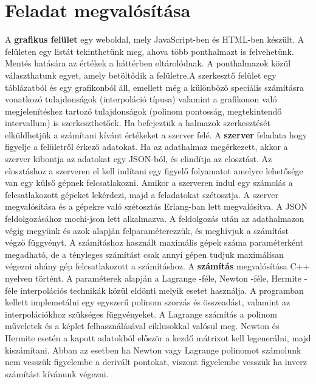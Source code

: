 \documentclass{elteikthesis}
\begin{document}
\section{Feladat megvalósítása}
A \textbf{grafikus felület}  egy weboldal, mely JavaScript-ben és HTML-ben készült.
 A felületen egy listát tekinthetünk meg, ahova több ponthalmazt is felvehetünk. \newline  Mentés hatására az értékek a háttérben eltárolódnak. A ponthalmazok közül választhatunk egyet, amely betöltődik a felületre.\newline A szerkesztő felület egy táblázatból és egy grafikonból áll, emellett még a különböző speciális számításra vonatkozó tulajdonságok (interpoláció típusa) valamint a grafikonon való megjelenítéshez tartozó tulajdonságok (polinom pontosság, megtekintendő intervallum) is szerkeszthetőek. \newline Ha befejeztük a halmazok szerkesztését elküldhetjük a számítani kívánt értékeket a szerver felé.
 \newline\newline
A \textbf{szerver} feladata hogy figyelje a felületről érkező adatokat. Ha az adathalmaz megérkezett, akkor a szerver kibontja az adatokat egy JSON-ból, és elindítja az elosztást. \newline
Az elosztáshoz a szerveren el kell indítani egy figyelő folyamatot amelyre lehetősége van egy külső gépnek felcsatlakozni. Amikor a szerveren indul egy számolás a felcsatlakozott gépeket lekérdezi, majd a feladatokat szétosztja.\newline
A szerver megvalósítása és a gépekre való szétosztás Erlang-ban lett megvalósítva. A JSON feldolgozásához mochi-json lett alkalmazva. A feldolgozás után az adathalmazon végig megyünk és azok alapján felparaméterezzük, és meghívjuk a számítást végző függvényt.\newline
A számításhoz használt maximális gépek száma paraméterként megadható, de a tényleges számítást csak annyi gépen tudjuk maximálisan végezni ahány gép felcsatlakozott a számításhoz.
\newline\newline
A \textbf{számítás} megvalósítása C++ nyelven történt. A paraméterek alapján a Lagrange -féle, Newton -féle, Hermite -féle interpolációs technikák közül eldönti melyik esetet használja.\newline
A programban kellett implemetálni egy egyszerű polinom szorzás és összeadást, valamint az interpolációkhoz szükséges függvényeket. A Lagrange számítás a polinom műveletek és a képlet felhasználásával ciklusokkal valósul meg. Newton és Hermite esetén a kapott adatokból először a kezdő mátrixot kell legenerálni, majd kiszámítani. \newline
Abban az esetben ha Newton vagy Lagrange polinomot számolunk nem vesszük figyelembe a derivált pontokat, viszont figyelembe vesszük ha inverz számítást kívánunk végezni. 
\end{document}
